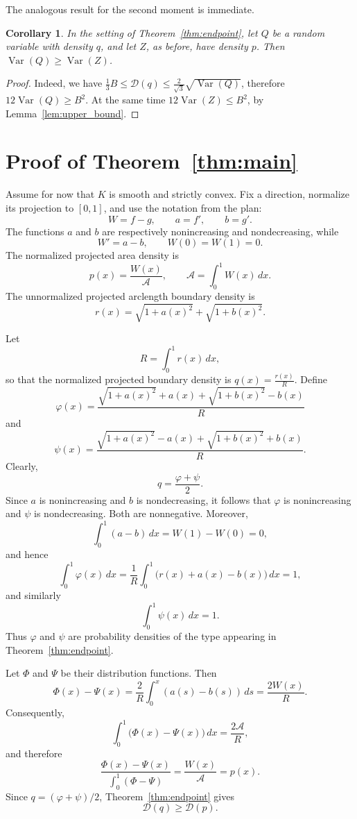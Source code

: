 \documentclass[final,12pt]{elsarticle}
\numberwithin{equation}{section}
\newtheorem{cor}[thm]{Corollary}
\theoremstyle{remark}
\newcommand{\Var}{\operatorname{Var}}
\newcommand{\Gini}{\mathcal D}
\theoremstyle{definition}
\begin{document}
The analogous result for the second moment is immediate.
\begin{cor}\label{cor:sec_mom}
    In the setting of Theorem~\ref{thm:endpoint}, let $Q$ be a random variable with density $q$, and let $Z$, as before, have density $p$. Then  $\Var(Q) \geq \Var(Z)$.
\end{cor}
\begin{proof}
    Indeed, we have $\frac{1}{3}B \leq \Gini(q) \leq \frac{2}{\sqrt{3}} \sqrt{\Var(Q)}$, therefore $12 \Var(Q) \geq B^2$. At the same time $12 \Var(Z) \leq B^2$, by Lemma~\ref{lem:upper_bound}.
\end{proof}

\section{Proof of Theorem~\ref{thm:main}}

Assume for now that $K$ is smooth and strictly convex. Fix a direction, normalize its projection to $[0,1]$, and use the notation from the plan:
$$
 W=f-g,\qquad a=f',\qquad b=g'.
$$
The functions $a$ and $b$ are respectively nonincreasing and nondecreasing, while
$$
 W'=a-b,\qquad W(0)=W(1)=0.
$$
The normalized projected area density is
\begin{equation}\label{eq:area-density}
 p(x)=\frac{W(x)}{\mathcal A},
 \qquad
 \mathcal A=\int_0^1W(x)\,dx.
\end{equation}
The unnormalized projected arclength boundary density is
$$
 r(x)=\sqrt{1+a(x)^2}+\sqrt{1+b(x)^2}.
$$

Let
$$
R=\int_0^1r(x)\,dx,
$$
so that the normalized projected boundary density is
$
q(x)=\frac{r(x)}{R}.
$
Define
$$
\varphi(x)
=
\frac{
\sqrt{1+a(x)^2}+a(x)
+
\sqrt{1+b(x)^2}-b(x)
}{R}
$$
and
$$
\psi(x)
=
\frac{
\sqrt{1+a(x)^2}-a(x)
+
\sqrt{1+b(x)^2}+b(x)
}{R}.
$$
Clearly,
$$
q=\frac{\varphi+\psi}{2}.
$$
 Since $a$ is nonincreasing and $b$ is nondecreasing, it follows that
$\varphi$ is nonincreasing and $\psi$ is nondecreasing. Both are nonnegative. Moreover,
$$
\int_0^1(a-b)\,dx=W(1)-W(0)=0,
$$
and hence
$$
\int_0^1\varphi(x)\,dx
=
\frac{1}{R}\int_0^1\bigl(r(x)+a(x)-b(x)\bigr)\,dx
=1,
$$
and similarly
$$
\int_0^1\psi(x)\,dx=1.
$$
Thus $\varphi$ and $\psi$ are probability densities of the type appearing in
Theorem~\ref{thm:endpoint}.


Let $\Phi$ and $\Psi$ be their distribution functions. Then
$$
\Phi(x)-\Psi(x)
=
\frac{2}{R}\int_0^x(a(s)-b(s))\,ds
=
\frac{2W(x)}{R}.
$$
Consequently,
$$
\int_0^1\bigl(\Phi(x)-\Psi(x)\bigr)\,dx
=
\frac{2 \mathcal A}{R},
$$
and therefore
$$
\frac{\Phi(x)-\Psi(x)}
{\displaystyle\int_0^1(\Phi-\Psi)}
=
\frac{W(x)}{\mathcal A}
=
p(x).
$$
Since $q=(\varphi+\psi)/2$, Theorem~\ref{thm:endpoint} gives
$$
\Gini(q)\ge \Gini(p).
$$
\end{document}

